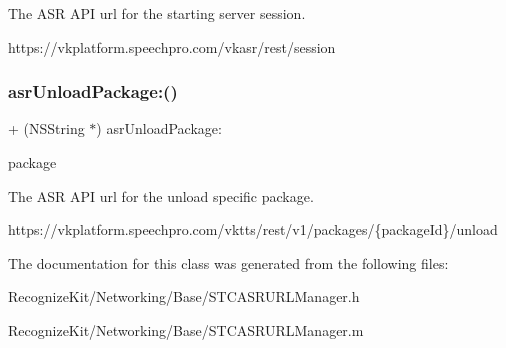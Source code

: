 The A\+SR A\+PI url for the starting server session. 
\begin{DoxyCode}
https:\textcolor{comment}{//vkplatform.speechpro.com/vkasr/rest/session}
\end{DoxyCode}
 \hypertarget{interface_s_t_c_a_s_r_u_r_l_manager_ac17d64cd68e803e6a0dacb8f158e97ce}{}\label{interface_s_t_c_a_s_r_u_r_l_manager_ac17d64cd68e803e6a0dacb8f158e97ce} 
\subsubsection{\texorpdfstring{asr\+Unload\+Package\+:()}{asrUnloadPackage:()}}
{\footnotesize\ttfamily + (N\+S\+String $\ast$) asr\+Unload\+Package\+: \begin{DoxyParamCaption}\item[{(N\+S\+String $\ast$)}]{package }\end{DoxyParamCaption}}

The A\+SR A\+PI url for the unload specific package. 
\begin{DoxyCode}
https:\textcolor{comment}{//vkplatform.speechpro.com/vktts/rest/v1/packages/\{packageId\}/unload}
\end{DoxyCode}
 

The documentation for this class was generated from the following files\+:\begin{DoxyCompactItemize}
\item 
Recognize\+Kit/\+Networking/\+Base/S\+T\+C\+A\+S\+R\+U\+R\+L\+Manager.\+h\item 
Recognize\+Kit/\+Networking/\+Base/S\+T\+C\+A\+S\+R\+U\+R\+L\+Manager.\+m\end{DoxyCompactItemize}
